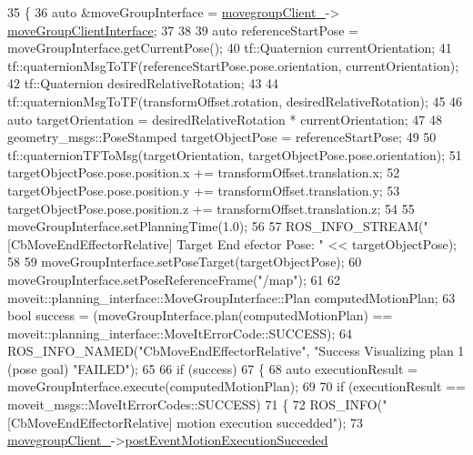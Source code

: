 \begin{DoxyCode}
35 \{
36     \textcolor{keyword}{auto} &moveGroupInterface = \hyperlink{classmoveit__z__client_1_1CbMoveEndEffectorRelative_a5f009b3baaaa47ad3be09d43bab33c07}{movegroupClient\_}->
      \hyperlink{classmoveit__z__client_1_1ClMoveGroup_af86e046b837be0ef4afa9893d8808f20}{moveGroupClientInterface};
37 
38 
39     \textcolor{keyword}{auto} referenceStartPose = moveGroupInterface.getCurrentPose();
40     tf::Quaternion currentOrientation;
41     tf::quaternionMsgToTF(referenceStartPose.pose.orientation, currentOrientation);
42     tf::Quaternion desiredRelativeRotation;
43 
44     tf::quaternionMsgToTF(transformOffset.rotation, desiredRelativeRotation);
45 
46     \textcolor{keyword}{auto} targetOrientation = desiredRelativeRotation * currentOrientation;
47 
48     geometry\_msgs::PoseStamped targetObjectPose = referenceStartPose;
49 
50     tf::quaternionTFToMsg(targetOrientation, targetObjectPose.pose.orientation);
51     targetObjectPose.pose.position.x += transformOffset.translation.x;
52     targetObjectPose.pose.position.y += transformOffset.translation.y;
53     targetObjectPose.pose.position.z += transformOffset.translation.z;
54 
55     moveGroupInterface.setPlanningTime(1.0);
56 
57     ROS\_INFO\_STREAM(\textcolor{stringliteral}{"[CbMoveEndEffectorRelative] Target End efector Pose: "} << targetObjectPose);
58 
59     moveGroupInterface.setPoseTarget(targetObjectPose);
60     moveGroupInterface.setPoseReferenceFrame(\textcolor{stringliteral}{"/map"});
61 
62     moveit::planning\_interface::MoveGroupInterface::Plan computedMotionPlan;
63     \textcolor{keywordtype}{bool} success = (moveGroupInterface.plan(computedMotionPlan) == 
      moveit::planning\_interface::MoveItErrorCode::SUCCESS);
64     ROS\_INFO\_NAMED(\textcolor{stringliteral}{"CbMoveEndEffectorRelative"}, \textcolor{stringliteral}{"Success Visualizing plan 1 (pose goal) %
       \textcolor{stringliteral}{"FAILED"});
65 
66     \textcolor{keywordflow}{if} (success)
67     \{
68         \textcolor{keyword}{auto} executionResult = moveGroupInterface.execute(computedMotionPlan);
69 
70         \textcolor{keywordflow}{if} (executionResult == moveit\_msgs::MoveItErrorCodes::SUCCESS)
71         \{
72             ROS\_INFO(\textcolor{stringliteral}{"[CbMoveEndEffectorRelative] motion execution succedded"});
73             \hyperlink{classmoveit__z__client_1_1CbMoveEndEffectorRelative_a5f009b3baaaa47ad3be09d43bab33c07}{movegroupClient\_}->\hyperlink{classmoveit__z__client_1_1ClMoveGroup_ad6b8f0acbe3d11b5c39a83911a3d95b8}{postEventMotionExecutionSucceded}
}
\end{DoxyCode}
